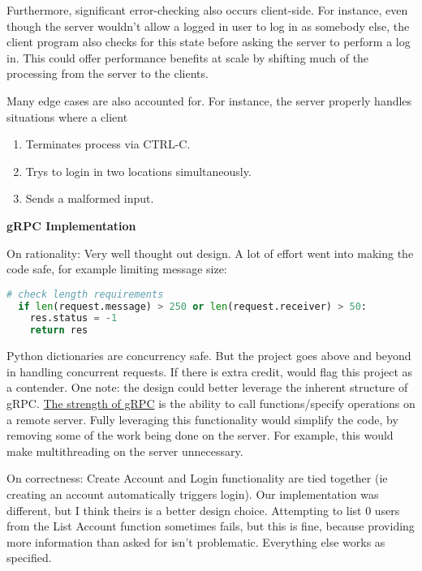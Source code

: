 \documentclass[9pt,twocolumn,twoside]{osajnl}
\begin{document}
\medskip

\noindent Furthermore, significant error-checking also occurs client-side. For instance, even though the server wouldn't allow a logged in user to log in as somebody else, the client program also checks for this state before asking the server to perform a log in. This could offer performance benefits at scale by shifting much of the processing from the server to the clients.

\medskip

\noindent Many edge cases are also accounted for. For instance, the server properly handles situations where a client 
\begin{enumerate}
  \item Terminates process via CTRL-C.
  \item Trys to login in two locations simultaneously.
  \item Sends a malformed input.
\end{enumerate}

\smallskip

\noindent 

\noindent \textbf{gRPC Implementation}

\smallskip

\noindent On rationality: Very well thought out design. A lot of effort went into making the code safe, for example limiting message size: 

\begin{lstlisting}[language=python,caption={Code Safety Example}]
  # check length requirements
  if len(request.message) > 250 or len(request.receiver) > 50:
    res.status = -1
    return res
\end{lstlisting}

\noindent Python dictionaries are concurrency safe. But the project goes above and beyond in handling concurrent requests. If there is extra credit, would flag this project as a contender. One note: the design could better leverage the inherent structure of gRPC. \href{https://web.eecs.umich.edu/~mosharaf/Readings/RPC.pdf}{The strength of gRPC} is the ability to call functions/specify operations on a remote server. Fully leveraging this functionality would simplify the code, by removing some of the work being done on the server. For example, this would make multithreading on the server unnecessary.

\medskip

\noindent On correctness: Create Account and Login functionality are tied together (ie creating an account automatically triggers login). Our implementation was different, but I think theirs is a better design choice. Attempting to list 0 users from the List Account function sometimes fails, but this is fine, because providing more information than asked for isn't problematic. Everything else works as specified. 
\end{document}
